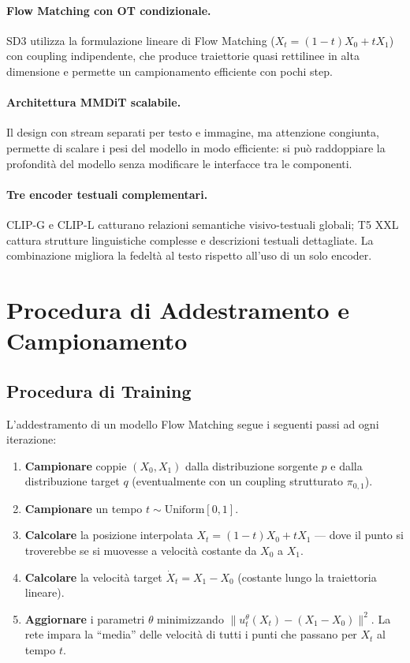 \paragraph{Flow Matching con OT condizionale.}
SD3 utilizza la formulazione lineare di Flow Matching ($X_t = (1-t)X_0 + tX_1$)
con coupling indipendente, che produce traiettorie quasi rettilinee in
alta dimensione e permette un campionamento efficiente con pochi step.

\paragraph{Architettura MMDiT scalabile.}
Il design con stream separati per testo e immagine, ma attenzione
congiunta, permette di scalare i pesi del modello in modo efficiente:
si può raddoppiare la profondità del modello senza modificare le
interfacce tra le componenti.

\paragraph{Tre encoder testuali complementari.}
CLIP-G e CLIP-L catturano relazioni semantiche visivo-testuali globali;
T5 XXL cattura strutture linguistiche complesse e descrizioni testuali
dettagliate. La combinazione migliora la fedeltà al testo rispetto all'uso
di un solo encoder.

\section{Procedura di Addestramento e Campionamento}
\label{sec:fm-training-sampling}

\subsection{Procedura di Training}
\label{subsec:fm-training}

L'addestramento di un modello Flow Matching segue i seguenti passi ad
ogni iterazione:

\begin{enumerate}
  \item \textbf{Campionare} coppie $(X_0, X_1)$ dalla distribuzione
        sorgente $p$ e dalla distribuzione target $q$ (eventualmente
        con un coupling strutturato $\pi_{0,1}$).
  \item \textbf{Campionare} un tempo $t \sim \mathrm{Uniform}[0,1]$.
  \item \textbf{Calcolare} la posizione interpolata
        $X_t = (1-t)X_0 + tX_1$ — dove il punto si troverebbe se si
        muovesse a velocità costante da $X_0$ a $X_1$.
  \item \textbf{Calcolare} la velocità target $\dot X_t = X_1 - X_0$
        (costante lungo la traiettoria lineare).
  \item \textbf{Aggiornare} i parametri $\theta$ minimizzando
        $\|u_t^\theta(X_t) - (X_1 - X_0)\|^2$. La rete impara la
        ``media'' delle velocità di tutti i punti che passano per
        $X_t$ al tempo $t$.
\end{enumerate}

